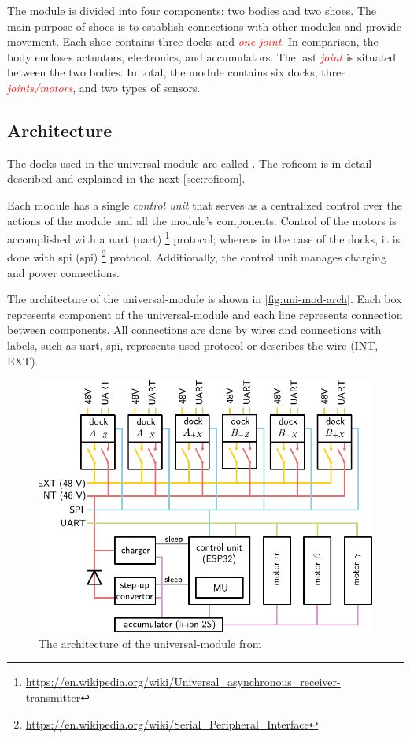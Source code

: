 \documentclass[
  digital,     %
  oneside,     %
  nosansbold,  %
  nocolorbold, %
  nolof,         %
  nolot,         %
]{fithesis4}
\newcommand{\TODO}[1]{\textcolor{red}{\textit{#1}}}
\begin{document}
The module is divided into four components: two bodies and two shoes. The main purpose of shoes is to establish connections with other modules and provide movement. Each shoe contains three docks and \TODO{one joint}. In comparison, the body encloses actuators, electronics, and accumulators. The last \TODO{joint} is situated between the two bodies. In total, the module contains six docks, three \TODO{joints/motors}, and two types of sensors.


\subsection{ Architecture }

The docks used in the \gls{universal-module} are called . The \acrshort{roficom} is in detail described and explained in the next \autoref{sec:roficom}.

Each module has a single \emph{control unit} that serves as a centralized control over the actions of the module and all the module's components. Control of the motors is accomplished with a \acrshort{uart} (\acrlong{uart}) \footnote{\url{https://en.wikipedia.org/wiki/Universal_asynchronous_receiver-transmitter}} protocol; whereas in the case of the docks, it is done with \acrshort{spi} (\acrlong{spi}) \footnote{\url{https://en.wikipedia.org/wiki/Serial_Peripheral_Interface}} protocol. Additionally, the control unit manages charging and power connections.

The architecture of the \gls{universal-module} is shown in \autoref{fig:uni-mod-arch}. Each box represents component of the \gls{universal-module} and each line represents connection between components. All connections are done by wires and connections with labels, such as \acrshort{uart}, \acrshort{spi}, represents used protocol or describes the wire (INT, EXT). 

\begin{figure}[ht]
    \includegraphics{ assets/universal-module-arch.pdf }
    \caption{The architecture of the \gls{universal-module} from \TODO{\cite[p.~35]{Mrazek2019thesis}}}
    \label{fig:uni-mod-arch}
\end{figure}
\end{document}
